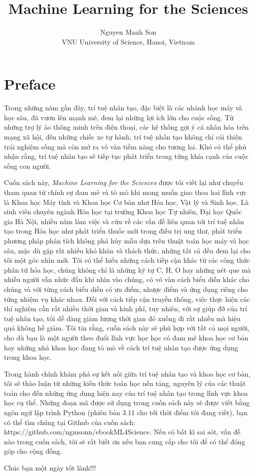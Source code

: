 \documentclass{report}
\author{Nguyen Manh Son \\
        \small VNU University of Science, Hanoi, Vietnam \\}
\title{Machine Learning for the Sciences}
\date{}
\begin{document}
\onehalfspacing
\maketitle

\section*{Preface}
Trong những năm gần đây, trí tuệ nhân tạo, đặc biệt là các nhánh học máy và học sâu, đã vươn lên mạnh mẽ,
đem lại những lợi ích lớn cho cuộc sống. Từ những trợ lý ảo thông minh trên điện thoại, 
các hệ thống gợi ý cá nhân hóa trên mạng xã hội, đến những chiếc xe tự hành,
trí tuệ nhân tạo không chỉ cải thiện trải nghiệm sống mà còn mở ra vô vàn tiềm năng cho tương lai.
Khó có thể phủ nhận rằng, trí tuệ nhân tạo sẽ tiếp tục phát triển trong từng khía cạnh của cuộc sống con người.

Cuốn sách này, \textit{Machine Learning for the Sciences} được tôi viết lại như chuyến tham quan từ chính sự đam mê và tò mò
khi mong muốn giao thoa hai lĩnh vực là Khoa học Máy tính và Khoa học Cơ bản như Hóa học, Vật lý và Sinh học.
Là sinh viên chuyên ngành Hóa học tại trường Khoa học Tự nhiên, Đại học Quốc gia Hà Nội, nhiều năm làm việc và
cứu về các vấn đề liên quan tới trí tuệ nhân tạo trong Hóa học như phát triển thuốc mới trong điều trị ung thư,
phát triển phương pháp phân tích không phá hủy mẫu dựa trên thuật toán học máy và học sâu, mặc dù gặp rất nhiều
khó khăn và thách thức, những tất cả đều đem lại cho tôi một góc nhìn mới. 
Tôi có thể hiểu những cách tiếp cận khác từ các công thức phân tử hóa học, chúng không chỉ là
những ký tự C, H, O hay những nét que mà nhiều người vẫn nhức đầu khi nhìn vào chúng, có vô vàn cách
biểu diễn khác cho chúng và với từng cách biểu diễn có ưu điểm, nhược điểm và ứng dụng riêng cho từng nhiệm vụ
khác nhau. Đối với cách tiếp cận truyền thống, việc thực hiện các thí nghiệm cần rất nhiều thời gian và kinh phí,
tuy nhiên, với sự giúp đỡ của trí tuệ nhân tạo, tôi dễ dàng giảm lượng thời gian đó xuống đi rất nhiều mà
hiệu quả không hề giảm. Tôi tin rằng, cuốn sách này sẽ phù hợp với tất cả mọi người,
cho dù bạn là một người theo đuổi lĩnh vực học học có đam mê khoa học cơ bản hay những nhà khoa học đang tò mò
về cách trí tuệ nhân tạo được ứng dụng trong khoa học.

Trong hành chính khám phá sự kết nối giữa trí tuệ nhân tạo và khoa học cơ bản, tôi sẽ thảo luận
từ những kiến thức toán học nền tảng, nguyên lý của các thuật toán cho đến những ứng dụng hiện nay của trí tuệ nhân tạo
trong lĩnh vực khoa học cụ thể. Những đoạn mã được sử dụng trong cuốn sách này sẽ được viết bằng ngôn ngữ lập trình Python
(phiên bản 3.11 cho tới thời điểm tôi đang viết), bạn có thể tìm chúng tại Github của cuốn sách: https://github.com/ngmsonn/ebookML4Science.
Nếu có bất kì sai sót, vấn đề nào trong cuốn sách, tôi sẽ rất biết ơn nếu bạn cung cấp cho tôi để có thể đóng góp cho cộng đồng.


Chúc bạn một ngày tốt lành!!!



\tableofcontents



\end{document}
